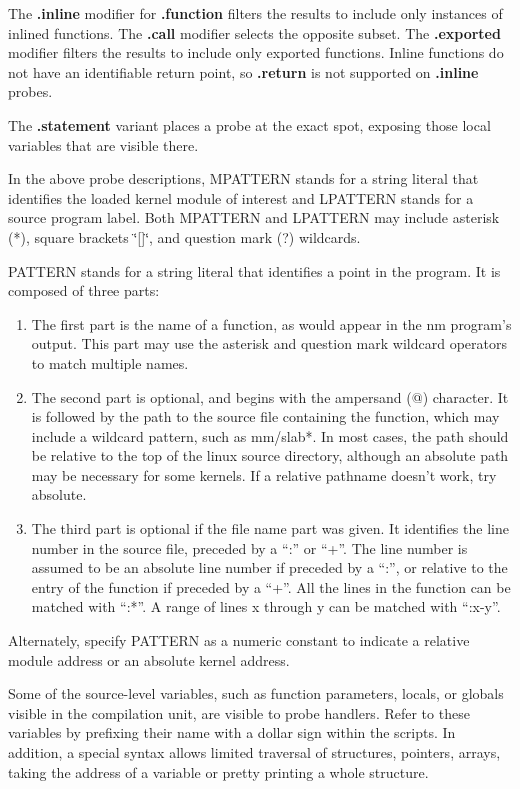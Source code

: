 \documentclass[twoside,english]{article}
\begin{document}
The \textbf{.inline} modifier for \textbf{.function} filters the results to include only
instances of inlined functions. The \textbf{.call} modifier selects the opposite subset.  
The \textbf{.exported} modifier filters the results to include only exported functions.
Inline functions do not have an identifiable return point, so \textbf{.return}
is not supported on \textbf{.inline} probes.

The \textbf{.statement} variant places a probe at the exact spot, exposing those local
variables that are visible there.

In the above probe descriptions, MPATTERN stands for a string literal
that identifies the loaded kernel module of interest and LPATTERN
stands for a source program label. Both MPATTERN and LPATTERN may
include asterisk ({*}), square brackets \char`\"{}{[}]\char`\"{}, and
question mark (?) wildcards.

PATTERN stands for a string literal that identifies a point in the program.
It is composed of three parts:

\begin{enumerate}
\item The first part is the name of a function, as would appear in the nm program's
output. This part may use the asterisk and question mark wildcard operators
to match multiple names.
\item The second part is optional, and begins with the ampersand (@) character.
It is followed by the path to the source file containing the function,
which may include a wildcard pattern, such as mm/slab{*}.
In most cases, the path should be relative to the top of the
linux source directory, although an absolute path may be necessary for some kernels.
If a relative pathname doesn't work, try absolute.
\item The third part is optional if the file name part was given. It identifies
the line number in the source file, preceded by a ``:'' or ``+''.
The line number is assumed to be an
absolute line number if preceded by a ``:'', or relative to the entry of
the function if preceded by a ``+''.
All the lines in the function can be matched with ``:*''.
A range of lines x through y can be matched with ``:x-y''.

\end{enumerate}
Alternately, specify PATTERN as a numeric constant to indicate a relative
module address or an absolute kernel address.

Some of the source-level variables, such as function parameters, locals,
or globals visible in the compilation unit, are visible to probe handlers.
Refer to these variables by prefixing their name with a dollar sign within
the scripts. In addition, a special syntax allows limited traversal of
structures, pointers, arrays, taking the address of a variable or pretty
printing a whole structure.
\end{document}
